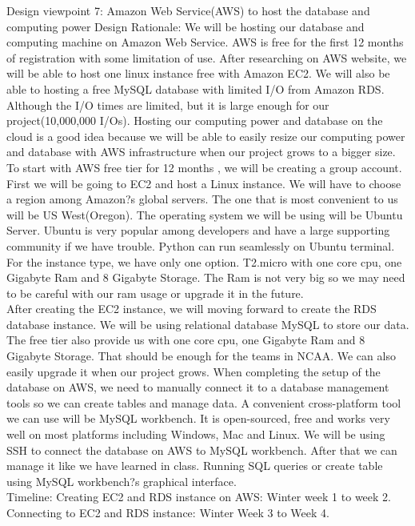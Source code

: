 \documentclass[journal,onecolumn]{IEEEtran}
\begin{document}
{\large Design viewpoint 7: Amazon Web Service(AWS) to host the database and computing power}
{\large Design Rationale:}
We will be hosting our database and computing machine on Amazon Web Service. AWS is free for the first 12 months of registration with some limitation of use. After researching on AWS website, we will be able to host one linux instance free with Amazon EC2. We will also be able to hosting a free MySQL database with limited I/O from Amazon RDS. Although the I/O times are limited, but it is large enough for our project(10,000,000 I/Os). Hosting our computing power and database on the cloud is a good idea because we will be able to easily resize our computing power and database with AWS infrastructure when our project grows to a bigger size. \\
To start with AWS free tier for 12 months , we will be creating a group account. First we will be going to EC2 and host a Linux instance. We will have to choose a region among Amazon?s global servers. The one that is most convenient to us will be US West(Oregon). The operating system we will be using will be Ubuntu Server. Ubuntu is very popular among developers and have a large supporting community if we have trouble. Python can run seamlessly on Ubuntu terminal. For the instance type, we have only one option. T2.micro with one core cpu, one Gigabyte Ram and 8 Gigabyte Storage. The Ram is not very big so we may need to be careful with our ram usage or upgrade it in the future. \\
After creating the EC2 instance, we will moving forward to create the RDS database instance. We will be using relational database MySQL to store our data. The free tier also provide us with one core cpu, one Gigabyte Ram and 8 Gigabyte Storage. That should be enough for the teams in NCAA. We can also easily upgrade it when our project grows. When completing the setup of the database on AWS, we need to manually connect it to a database management tools so we can create tables and manage data. A convenient cross-platform tool we can use will be MySQL workbench. It is open-sourced, free and works very well on most platforms including Windows, Mac and Linux. We will be using SSH to connect the database on AWS to MySQL workbench. After that we can manage it like we have learned in class. Running SQL queries or create table using MySQL workbench?s graphical interface. \\
Timeline: Creating EC2 and RDS instance on AWS: Winter week 1 to week 2. Connecting to EC2 and RDS instance: Winter Week 3 to Week 4.\\
\end{document}
